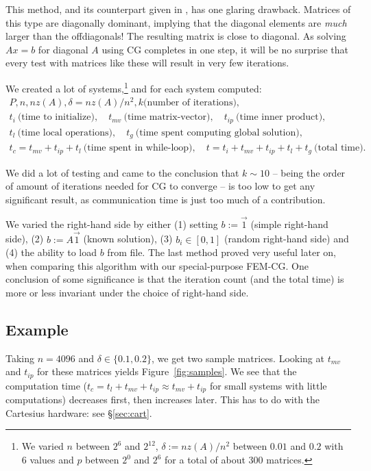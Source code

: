 \documentclass[11pt]{amsart}
\theoremstyle{definition}
\begin{document}
This method, and its counterpart given in \cite[Ex.~4.6]{biss04}, has one glaring drawback. Matrices of this type are diagonally dominant, implying that the diagonal elements are \emph{much} larger than the offdiagonals! The resulting matrix is close to diagonal. As solving $Ax=b$ for diagonal $A$ using CG completes in one step, it will be no surprise that every test with matrices like these will result in very few iterations.

We created a lot of systems,\footnote{We varied $n$ between $2^6$ and $2^{12}$, $\delta := nz(A)/n^2$ between $0.01$ and $0.2$ with 6 values and $p$ between $2^0$ and $2^6$ for a total of about 300 matrices. } and for each system computed:
\begin{gather*} 
P, n, nz(A), \delta = nz(A)/n^2, k \text{(number of iterations)}, \\
t_i~ \text{(time to initialize)}, \quad t_{mv}~ \text{(time matrix-vector)}, \quad t_{ip}~ \text{(time inner product)}, \\
t_l~ \text{(time local operations)}, \quad t_g~ \text{(time spent computing global solution)}, \\
t_c = t_{mv} + t_{ip} + t_l~ \text{(time spent in while-loop)}, \quad t = t_i + t_{mv} + t_{ip} + t_l + t_g~ \text{(total time)}.
\end{gather*}

We did a lot of testing and came to the conclusion that $k\sim 10$ -- being the order of amount of iterations needed for CG to converge --  is too low to get any significant result, as communication time is just too much of a contribution. 

We varied the right-hand side by either (1) setting $b := \vec 1$ (simple right-hand side), (2) $b := A\vec 1$ (known solution), (3) $b_i \in [0, 1]$ (random right-hand side) and (4) the ability to load $b$ from file. The last method proved very useful later on, when comparing this algorithm with our special-purpose FEM-CG. One conclusion of some significance is that the iteration count (and the total time) is more or less invariant under the choice of right-hand side.

\subsection{Example}
Taking $n = 4096$ and $\delta \in \{0.1, 0.2\}$, we get two sample matrices. Looking at $t_{mv}$ and $t_{ip}$ for these matrices yields Figure~\ref{fig:samples}. We see that the computation time ($t_c = t_l + t_{mv} + t_{ip} \approx t_{mv} + t_{ip}$ for small systems with little computations) decreases first, then increases later. This has to do with the Cartesius hardware: see \S \ref{sec:cart}.
\end{document}
